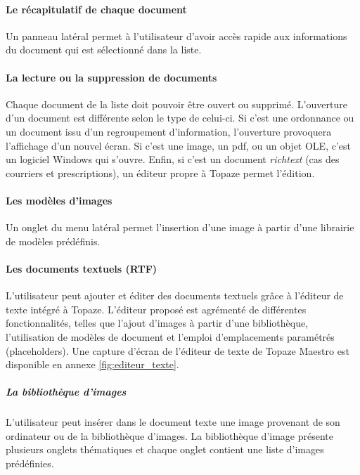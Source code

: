 \paragraph*{Le récapitulatif de chaque document\\}
Un panneau latéral permet à l'utilisateur d'avoir accès rapide aux informations du document qui est sélectionné dans la liste.

\paragraph*{La lecture ou la suppression de documents\\}
Chaque document de la liste doit pouvoir être ouvert ou supprimé.
L'ouverture d'un document est différente selon le type de celui-ci. Si c'est une ordonnance ou un document issu d'un regroupement d'information, l'ouverture provoquera l'affichage d'un nouvel écran. Si c'est une image, un pdf, ou un objet OLE, c'est un logiciel Windows qui s'ouvre. Enfin, si c'est un document \textit{richtext} (cas des courriers et prescriptions), un éditeur propre à Topaze permet l'édition. 

\paragraph*{Les modèles d'images\\}
Un onglet du menu latéral permet l'insertion d'une image à partir d'une librairie de modèles prédéfinis.

\paragraph*{Les documents textuels (\gls{RTF})\\}
L'utilisateur peut ajouter et éditer des documents textuels grâce à l'éditeur de texte intégré à Topaze. 
L'éditeur proposé est agrémenté de différentes fonctionnalités, telles que l'ajout d'images à partir d'une bibliothèque, l'utilisation de modèles de document et l'emploi d'emplacements paramétrés (placeholders).
Une capture d'écran de l'éditeur de texte de Topaze Maestro est disponible en annexe \ref{fig:editeur_texte}.

\subparagraph*{La bibliothèque d'images}
L'utilisateur peut insérer dans le document texte une image provenant de son ordinateur ou de la bibliothèque d'images.
La bibliothèque d'image présente plusieurs onglets thématiques et chaque onglet contient une liste d'images prédéfinies.


